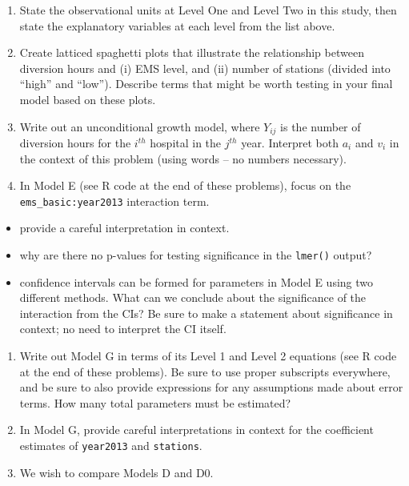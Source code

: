 \documentclass[
]{krantz}
\providecommand{\tightlist}{%
  \setlength{\itemsep}{0pt}\setlength{\parskip}{0pt}}
\begin{document}
\begin{enumerate}
  \begin{enumerate}
  \def\labelenumii{\alph{enumii}.}
  \item
    State the observational units at Level One and Level Two in this study, then state the explanatory variables at each level from the list above.
  \item
    Create latticed spaghetti plots that illustrate the relationship between diversion hours and (i) EMS level, and (ii) number of stations (divided into ``high'' and ``low''). Describe terms that might be worth testing in your final model based on these plots.
  \item
    Write out an unconditional growth model, where \(Y_{ij}\) is the number of diversion hours for the \(i^{th}\) hospital in the \(j^{th}\) year. Interpret both \(a_i\) and \(v_i\) in the context of this problem (using words -- no numbers necessary).
  \item
    In Model E (see R code at the end of these problems), focus on the \texttt{ems\_basic:year2013} interaction term.
  \end{enumerate}

  \begin{itemize}
  \tightlist
  \item
    provide a careful interpretation in context.
  \item
    why are there no p-values for testing significance in the \texttt{lmer()} output?
  \item
    confidence intervals can be formed for parameters in Model E using two different methods. What can we conclude about the significance of the interaction from the CIs? Be sure to make a statement about significance in context; no need to interpret the CI itself.
  \end{itemize}

  \begin{enumerate}
  \def\labelenumii{\alph{enumii}.}
  \setcounter{enumii}{4}
  \item
    Write out Model G in terms of its Level 1 and Level 2 equations (see R code at the end of these problems). Be sure to use proper subscripts everywhere, and be sure to also provide expressions for any assumptions made about error terms. How many total parameters must be estimated?
  \item
    In Model G, provide careful interpretations in context for the coefficient estimates of \texttt{year2013} and \texttt{stations}.
  \item
    We wish to compare Models D and D0.
  \end{enumerate}


\end{enumerate}
\end{document}
